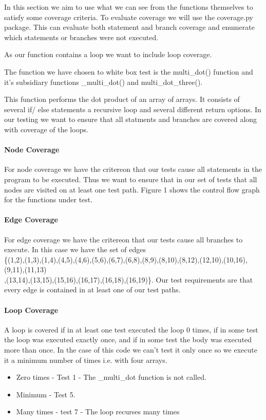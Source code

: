 In this section we aim to use what we can see from the functions themselves to satisfy some coverage
criteria. To evaluate coverage we will use the coverage.py package. This can evaluate both statement and branch coverage and enumerate which statements or branches were not executed.

As our function contains a loop we want to include loop coverage. 

The function we have chosen to white box test is the multi\_dot() function and it's subsidiary functions \_multi\_dot() and multi\_dot\_three().

This function performs the dot product of an array of arrays. It consists of several if/ else statements a recursive loop and several different return options. In our testing we want to ensure that all statments and branches are covered along with coverage of the loops. 



\paragraph{Node Coverage}


For node coverage we have the critereon that our tests cause all statements in the program to be executed. Thus we want to ensure that in our set of tests that all nodes are visited on at least one test path. Figure 1 shows the control flow graph for the functions under test. 



\paragraph{Edge Coverage}

For edge coverage we have the critereon that our tests cause all branches to execute. In this case we have the set of edges \\
\{(1,2),(1,3),(1,4),(4,5),(4,6),(5,6),(6,7),(6,8),(8,9),(8,10),(8,12),(12,10),(10,16),(9,11),(11,13)\\
,(13,14),(13,15),(15,16),(16,17),(16,18),(16,19)\}.
Our test requirements are that every edge is contained in at least one of our test paths.
\\

\paragraph{Loop Coverage}

A loop is covered if in at least one test executed the loop 0 times, if in some test the loop was executed exactly once, and if in some test the body was executed more than once. In the case of this code we can't test it only once so we execute it a minimum number of times i.e. with four arrays.
\begin{itemize}
\item Zero times - Test 1 - The \_multi\_dot function is not called.  
\item Minimum - Test 5.
\item Many times - test 7 - The loop recurses many times
\end{itemize}


